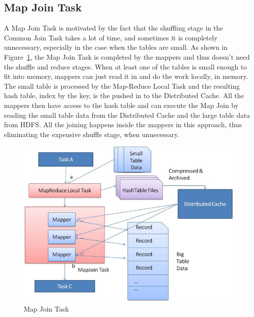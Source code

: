 \documentclass[11 pt ]{article}
\begin{document}
\subsection{Map Join Task}
A Map Join Task is motivated by the fact that the shuffling stage in the Common Join Task takes a lot of time, and sometimes it is completely unnecessary, especially in the case when the tables are small. As shown in Figure~\ref{fig:map-join}, the Map Join Task is completed by the mappers and thus doesn't need the shuffle and reduce stages. When at least one of the tables is small enough to fit into memory, mappers can just read it in and do the work locally, in memory. The small table is processed by the Map-Reduce Local Task and the resulting hash table, index by the key, is the pushed in to the Distributed Cache. All the mappers then have access to the hash table and can execute the Map Join by reading the small table data from the Distributed Cache and the large table data from HDFS. All the joining happens inside the mappers in this approach, thus eliminating the expensive shuffle stage, when unnecessary. 
\begin{figure}
	      \centering
                \includegraphics[scale=1]{mapjoin.jpg}
              \caption{Map Join Task \cite{facebook-join}}
              \label{fig:map-join}
\end{figure}
\end{document}
